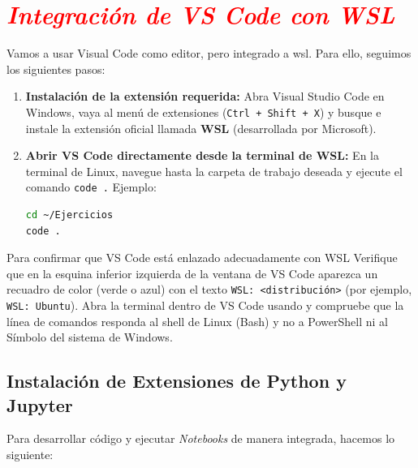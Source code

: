 \documentclass[12pt]{article}
\begin{document}
\section*{\textcolor{red}{\textit{Integración de VS Code con WSL}}}
Vamos a usar Visual Code como editor, pero integrado a wsl. Para ello, seguimos los siguientes pasos:
\begin{enumerate}
    \item \textbf{Instalación de la extensión requerida:}
    Abra Visual Studio Code en Windows, vaya al menú de extensiones (\lstinline|Ctrl + Shift + X|) y 
    busque e instale la extensión oficial llamada \textbf{WSL} (desarrollada por Microsoft).

    \item \textbf{Abrir VS Code directamente desde la terminal de WSL:}
    En la terminal de Linux, navegue hasta la carpeta de trabajo deseada y ejecute el 
    comando \lstinline|code .| Ejemplo:
    \begin{lstlisting}[language=bash]
cd ~/Ejercicios
code .
    \end{lstlisting}
\end{enumerate}
    Para confirmar que VS Code está enlazado adecuadamente con WSL
    Verifique que en la esquina inferior izquierda de la ventana de VS Code aparezca un recuadro de 
    color (verde o azul) con el texto \lstinline|WSL: <distribución>| (por ejemplo, \lstinline|WSL: Ubuntu|).
    Abra la terminal dentro de VS Code usando y compruebe que la línea de comandos responda al 
    shell de Linux (Bash) y no a PowerShell ni al Símbolo del sistema de Windows.

\subsection*{Instalación de Extensiones de Python y Jupyter}
Para desarrollar código y ejecutar \textit{Notebooks} de manera integrada, hacemos lo siguiente:
\end{document}
